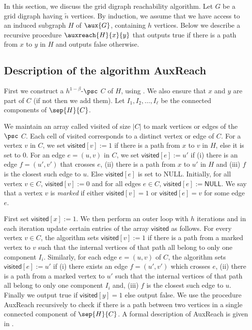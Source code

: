 \documentclass{toc}
\begin{document}
In this section, we discuss the grid %
digraph %
 reachability algorithm. Let $G$ be a grid %
digraph %
 having $\widetilde{n}$ vertices. By induction, we assume that we have access to %
an %
induced subgraph $H$ of $\aux{G}$, containing $h$ vertices. Below we describe a recursive procedure $\auxreach{H}{x}{y}$ that outputs \textsf{true} if there is a path from $x$ to $y$ in $H$ and outputs \textsf{false} otherwise.

\subsection{Description of the algorithm \textsf{AuxReach}}

First we construct a $h^{1-\beta}$-$\psc$ $C$ of $H$, using . We also ensure that $x$ and $y$ are part of $C$ (if not then we add them). Let $I_1, I_2, \ldots, I_{\ell}$ be the connected components of $\sep{H}{C}$.

We maintain an array called \textsf{visited} of size $|C|$ to mark vertices or edges of the $\psc$ $C$. Each cell of \textsf{visited} corresponds to a distinct vertex or edge of $C$. For a vertex $v$ in $C$, we set $\textsf{visited}[v] := 1$ if there is a path from $x$ to $v$ in $H$, else it is set to 0. For an edge $e = (u,v)$ in $C$, we set $\textsf{visited}[e] := u'$ if (i) there is an edge $f = (u',v')$ that crosses $e$, (ii) there is a path from $x$ to $u'$ in $H$ and (iii) $f$ is the closest such edge to $u$. Else $\textsf{visited}[e]$ is set to \textsf{NULL}. Initially, for all vertex $v \in C$, $\textsf{visited}[v] := 0$ and for all edges $e \in C$, $\textsf{visited}[e] := \textsf{NULL}$. We say that a vertex $v$ is \emph{marked} if either $\textsf{visited}[v] = 1$ or $\textsf{visited}[e] = v$ for some edge $e$.

First set $\textsf{visited}[x]:=1$. We then perform an outer loop with $h$ iterations and in each iteration update certain entries of the array $\textsf{visited}$ as follows. For every vertex $v \in C$, the algorithm sets $\textsf{visited}[v]:=1$ if there is a path from a marked vertex to $v$ such that the internal vertices of that path all belong to only one component $I_i$. Similarly, for each edge $e = (u,v)$ of $C$, the algorithm sets $\textsf{visited}[e]:=u'$ if (i) there exists an edge $f = (u',v')$ which crosses $e$, (ii) there is a path from a marked vertex to $u'$ such that the internal vertices of that path all belong to only one component $I_i$ and, (iii) $f$ is the closest such edge to $u$. Finally we output \textsf{true} if $\textsf{visited}[y] = 1$ else output \textsf{false}. We use the procedure \textsf{AuxReach} recursively to check if there is a path between two vertices in a single connected component of $\sep{H}{C}$. A formal description of \textsf{AuxReach} is given in .
\end{document}
